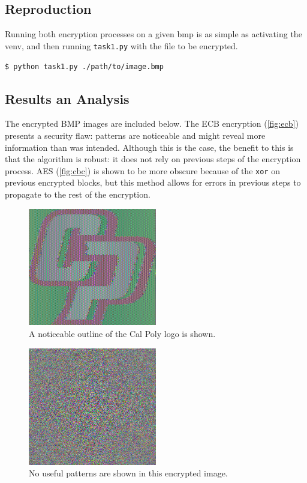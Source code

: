 \documentclass[11pt]{article}
\begin{document}
\subsection*{Reproduction}

Running both encryption processes on a given bmp is as simple as activating the venv, and then running \verb|task1.py| with the file to be encrypted.

\verb|$ python task1.py ./path/to/image.bmp|

\subsection*{Results an Analysis}

The encrypted BMP images are included below. The ECB encryption (\autoref{fig:ecb}) presents a security flaw: patterns are noticeable and might reveal more information than was intended. Although this is the case, the benefit to this is that the algorithm is robust: it does not rely on previous steps of the encryption process. AES (\autoref{fig:cbc}) is shown to be more obscure because of the \verb|xor| on previous encrypted blocks, but this method allows for errors in previous steps to propagate to the rest of the encryption.

\begin{figure}[!ht]
	\centering
	\includegraphics[width=0.5\textwidth]{./assets/ecb_encrypted.jpg}
	\caption{A noticeable outline of the Cal Poly logo is shown.}
	\label{fig:ecb}
\end{figure}

\begin{figure}[!ht]
	\centering
	\includegraphics[width=0.5\textwidth]{./assets/cbc_encrypted.jpg}
	\caption{No useful patterns are shown in this encrypted image.}
	\label{fig:cbc}
\end{figure}
\end{document}
